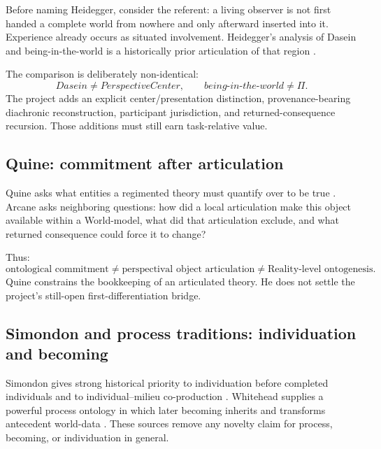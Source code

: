 \documentclass[11pt]{article}
\begin{document}
Before naming Heidegger, consider the referent: a living observer is not first handed a complete world from nowhere and only afterward inserted into it. Experience already occurs as situated involvement. Heidegger's analysis of Dasein and being-in-the-world is a historically prior articulation of that region \cite{Heidegger2026BeingTime,SEPHeidegger2025}.

The comparison is deliberately non-identical:
\begin{equation}
Dasein\neq PerspectiveCenter,\qquad
being\text{-}in\text{-}the\text{-}world\neq\Pi.
\end{equation}
The project adds an explicit center/presentation distinction, provenance-bearing diachronic reconstruction, participant jurisdiction, and returned-consequence recursion. Those additions must still earn task-relative value.

\subsection{Quine: commitment after articulation}

Quine asks what entities a regimented theory must quantify over to be true \cite{Quine1948WhatThereIs}. Arcane asks neighboring questions: how did a local articulation make this object available within a World-model, what did that articulation exclude, and what returned consequence could force it to change?

Thus:
\begin{equation}
\text{ontological commitment}
\neq
\text{perspectival object articulation}
\neq
\text{Reality-level ontogenesis}.
\end{equation}
Quine constrains the bookkeeping of an articulated theory. He does not settle the project's still-open first-differentiation bridge.

\subsection{Simondon and process traditions: individuation and becoming}

Simondon gives strong historical priority to individuation before completed individuals and to individual--milieu co-production \cite{Simondon2020Individuation}. Whitehead supplies a powerful process ontology in which later becoming inherits and transforms antecedent world-data \cite{Whitehead1978Process}. These sources remove any novelty claim for process, becoming, or individuation in general.
\end{document}
